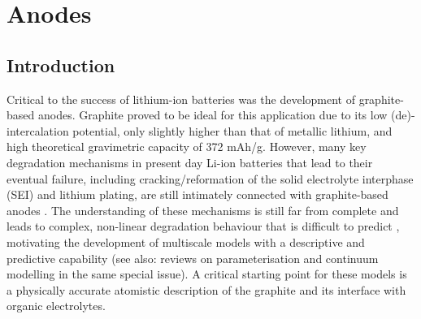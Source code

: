 \documentclass[../main.tex]{subfiles}
\begin{document}
\section{Anodes}
\label{sec:anodes}


\subsection{Introduction}
\label{sec:anodes_intro}

Critical to the success of lithium-ion batteries was the development of graphite-based anodes. Graphite proved to be ideal for this application due to its low (de)-intercalation potential, only slightly higher than that of metallic lithium, and high theoretical gravimetric capacity of 372 mAh/g. However, many key degradation mechanisms in present day Li-ion batteries that lead to their eventual failure, including cracking/reformation of the solid electrolyte interphase (SEI) and lithium plating, are still intimately connected with graphite-based anodes \cite{VETTER2005269,ma6041310}. The understanding of these mechanisms is still far from complete and leads to complex, non-linear degradation behaviour that is difficult to predict \cite{YANG201728}, motivating the development of multiscale models with a descriptive and predictive capability (see also: reviews on parameterisation and continuum modelling in the same special issue). A critical starting point for these models is a physically accurate atomistic description of the graphite and its interface with organic electrolytes. 
\end{document}
